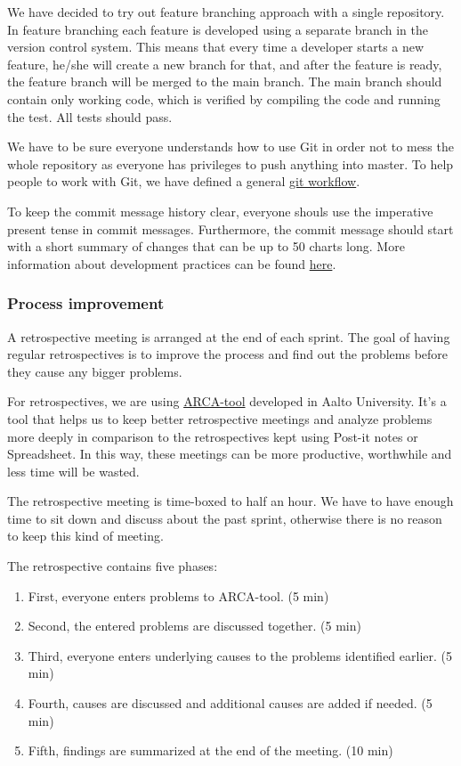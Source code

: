 We have decided to try out feature branching approach with a single repository.
In feature branching each feature is developed using a separate branch in the
version control system. This means that every time a developer starts a new
feature, he/she will create a new branch for that, and after the feature is
ready, the feature branch will be merged to the main branch. The main branch
should contain only working code, which is verified by compiling the code and
running the test. All tests should pass.

We have to be sure everyone understands how to use Git in order not to mess
the whole repository as everyone has privileges to push anything into master. To
help people to work with Git, we have defined a general
\href{https://docs.google.com/document/d/1wAih0JzkrZ4ySUZ_MO-F8MvGkPXKHicYbG1972Sxo2w/edit?usp=sharing}{git
workflow}. 

To keep the commit message history clear, everyone shouls use the imperative
present tense in commit messages. Furthermore, the commit message should start
with a short summary of changes that can be up to 50 charts long. More
information about development practices can be found
\href{https://docs.google.com/document/d/1Advu6FXwe2axjmO29-fMpw7hbDMeZwJzMF5ad391aBE/edit?usp=sharing}{here}.

\subsubsection{Process improvement}

A retrospective meeting is arranged at the end of each sprint. The goal of
having regular retrospectives is to improve the process and find out the
problems before they cause any bigger problems.

For retrospectives, we are using
\href{http://wirca.soberit.hut.fi/prod/}{ARCA-tool} developed in Aalto
University. It's a tool that helps us to keep better retrospective meetings and
analyze problems more deeply in comparison to the retrospectives kept using
Post-it notes or Spreadsheet. In this way, these meetings can be more
productive, worthwhile and less time will be wasted.

The retrospective meeting is time-boxed to half an hour. We have to have enough
time to sit down and discuss about the past sprint, otherwise there is no reason
to keep this kind of meeting.

The retrospective contains five phases:

\begin{enumerate}
\item First, everyone enters problems to ARCA-tool. (5 min)
\item Second, the entered problems are discussed together. (5 min)
\item Third, everyone enters underlying causes to the problems identified
earlier. (5 min)
\item Fourth, causes are discussed and additional causes are added if needed.
(5 min)
\item Fifth, findings are summarized at the end of the meeting. (10 min)
\end{enumerate}

